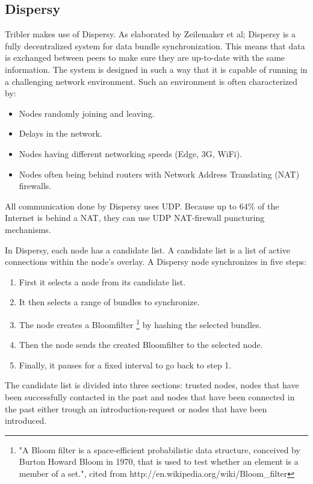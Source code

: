 	\subsection{Dispersy}
		Tribler makes use of Dispersy. As elaborated by Zeilemaker et al; Dispersy \cite{zeilemaker2013dispersy} is a fully decentralized system for data bundle synchronization. This means that data is exchanged between peers to make sure they are up-to-date with the same information. The system is designed in such a way that it is capable of running in a challenging network environment. Such an environment is often characterized by:
		\begin{itemize}
			\item Nodes randomly joining and leaving.
			\item Delays in the network.
			\item Nodes having different networking speeds (Edge, 3G, WiFi).
			\item Nodes often being behind routers with Network Address Translating (NAT) firewalls.
		\end{itemize}
		
		All communication done by Dispersy uses UDP. Because up to 64\% of the Internet is behind a NAT, they can use UDP NAT-firewall puncturing mechanisms\cite{zeilemaker2013dispersy}.
		
		In Dispersy, each node has a candidate list. A candidate list is a list of active connections within the node's overlay. A Dispersy node synchronizes in five steps:
		
		\begin{enumerate}
			\item First it selects a node from its candidate list.
			\item It then selects a range of bundles to synchronize.
			\item The node creates a Bloomfilter \footnote{"A Bloom filter is a space-efficient probabilistic data structure, conceived by Burton Howard Bloom in 1970, that is used to test whether an element is a member of a set.", cited from http://en.wikipedia.org/wiki/Bloom\_filter} by hashing the selected bundles.
			\item Then the node sends the created Bloomfilter to the selected node.
			\item Finally, it pauses for a fixed interval to go back to step 1.
		\end{enumerate}
		
		The candidate list is divided into three sections: trusted nodes, nodes that have been successfully contacted in the past and nodes that have been connected in the past either trough an introduction-request or nodes that have been introduced.
		
